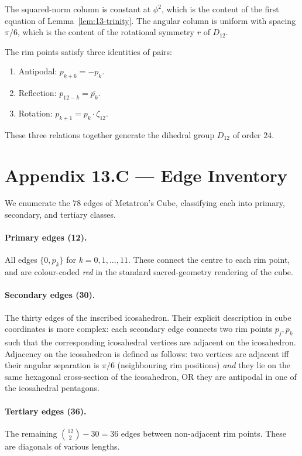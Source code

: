 The squared-norm column is constant at $\phi^{2}$, which is the
content of the first equation of Lemma~\ref{lem:13-trinity}. The
angular column is uniform with spacing $\pi/6$, which is the
content of the rotational symmetry $r$ of $D_{12}$.

The rim points satisfy three identities of pairs:

\begin{enumerate}
\item Antipodal: $p_{k+6} = -p_{k}$.
\item Reflection: $p_{12-k} = \overline{p_{k}}$.
\item Rotation: $p_{k+1} = p_{k} \cdot \zeta_{12}$.
\end{enumerate}

These three relations together generate the dihedral group $D_{12}$
of order $24$.

\section*{Appendix 13.C --- Edge Inventory}
\label{sec:13-appC}

We enumerate the $78$ edges of Metatron's Cube, classifying each
into primary, secondary, and tertiary classes.

\paragraph{Primary edges (12).}
All edges $\{0, p_{k}\}$ for $k = 0, 1, \ldots, 11$. These connect
the centre to each rim point, and are colour-coded \emph{red} in
the standard sacred-geometry rendering of the cube.

\paragraph{Secondary edges (30).}
The thirty edges of the inscribed icosahedron. Their explicit
description in cube coordinates is more complex: each secondary
edge connects two rim points $p_{j}, p_{k}$ such that the
corresponding icosahedral vertices are adjacent on the
icosahedron. Adjacency on the icosahedron is defined as follows:
two vertices are adjacent iff their angular separation is $\pi/6$
(neighbouring rim positions) \emph{and} they lie on the same
hexagonal cross-section of the icosahedron, OR they are antipodal
in one of the icosahedral pentagons.

\paragraph{Tertiary edges (36).}
The remaining $\binom{12}{2} - 30 = 36$ edges between non-adjacent
rim points. These are diagonals of various lengths.


